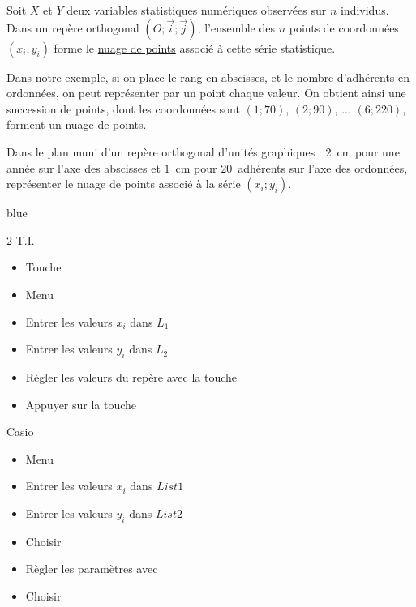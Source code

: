 \documentclass[french]{book}
\newcommand{\V}{\overrightarrow}
\newcommand{\Rep}{(O;\V{i};\V{j})}
\begin{document}
\begin{defn}
   Soit $X$ et $Y$ deux variables statistiques numériques observées sur $n$ individus.\\
   Dans un repère orthogonal $\Rep$, l'ensemble des $n$ points de coordonnées $(x_i,y_i)$ forme le \underline{nuage de points} associé à cette série statistique.
\end{defn}

Dans notre exemple, si on place le rang en abscisses, et le nombre d'adhérents en ordonnées, on peut représenter par un point chaque valeur. On obtient ainsi une succession de points, dont les coordonnées sont $(1;70)$, $(2;90)$, ... $(6;220)$, forment un \underline{nuage de points}.



\begin{exemple}
   Dans le plan muni d'un repère orthogonal d'unités graphiques : $2$~cm pour une année sur l'axe des abscisses et $1$~cm pour $20$~adhérents sur l'axe des ordonnées, représenter le nuage de points associé à la série $(x_{i};y_{i})$.
\end{exemple}

\begin{color}{blue}
   \begin{multicols}{2}
   T.I.
   \begin{itemize}
      \item[$\bullet$] Touche 
      \item[$\bullet$] Menu 
      \item[$\bullet$] Entrer les valeurs $x_i$ dans $L_1$
      \item[$\bullet$] Entrer les valeurs $y_i$ dans $L_2$
      \item[$\bullet$] Règler les valeurs du repère avec la touche 
      \item[$\bullet$] Appuyer sur la touche 
   \end{itemize}
   Casio
   \begin{itemize}
      \item[$\bullet$] Menu 
      \item[$\bullet$] Entrer les valeurs $x_i$ dans $List 1$
      \item[$\bullet$] Entrer les valeurs $y_i$ dans $List 2$
      \item[$\bullet$] Choisir 
      \item[$\bullet$] Règler les paramètres avec 
      \item[$\bullet$] Choisir 
   \end{itemize}
   \end{multicols}
\end{color}
\end{document}
